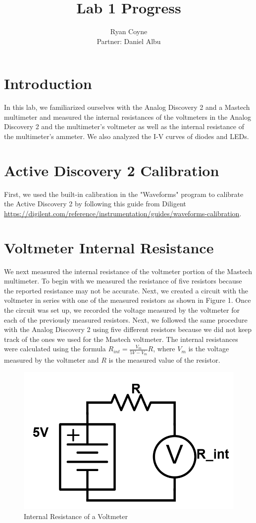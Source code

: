 \documentclass{article}
\title{Lab 1 Progress}
\author{Ryan Coyne \\ Partner: Daniel Albu}
\begin{document}
    \maketitle

    \section{Introduction}
    
    In this lab, we familiarized ourselves with the Analog Discovery 2 and a Mastech multimeter and measured the internal resistances of the voltmeters in the Analog Discovery 2 and the multimeter's voltmeter as well as the internal resistance of the multimeter's ammeter. We also analyzed the I-V curves of diodes and LEDs.

    \section{Active Discovery 2 Calibration}
    First, we used the built-in calibration in the "Waveforms" program to calibrate the Active Discovery 2 by following this guide from Diligent \href{https://digilent.com/reference/instrumentation/guides/waveforms-calibration}{https://digilent.com/reference/instrumentation/guides/waveforms-calibration}.

    \section{Voltmeter Internal Resistance}
    We next measured the internal resistance of the voltmeter portion of the Mastech multimeter. To begin with we measured the resistance of five resistors because the reported resistance may not be accurate. Next, we created a circuit with the voltmeter in series with one of the measured resistors as shown in Figure 1. Once the circuit was set up, we recorded the voltage measured by the voltmeter for each of the previously measured resistors. Next, we followed the same procedure with the Analog Discovery 2 using five different resistors because we did not keep track of the ones we used for the Mastech voltmeter. The internal resistances were calculated using the formula \(R_{int} = \frac{V_m}{5V - V_m}R\), where \(V_m\) is the voltage measured by the voltmeter and \(R\) is the measured value of the resistor. 

    \begin{figure}
        \centering
        \includegraphics[width=0.4\linewidth]{vm.png}
        \caption{Internal Resistance of a Voltmeter}
    \end{figure}
    
\end{document}
